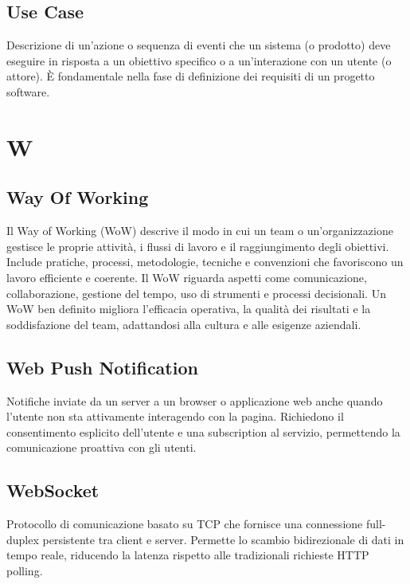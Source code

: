 \documentclass[10pt, letterpaper]{article}
\begin{document}
\subsection*{Use Case}
Descrizione di un'azione o sequenza di eventi che un sistema (o prodotto) deve eseguire in risposta a un obiettivo specifico o a un'interazione con un utente
(o attore). È fondamentale nella fase di definizione dei requisiti di un progetto software.

\section{W}

\subsection*{Way Of Working}
Il Way of Working (WoW) descrive il modo in cui un team o un'organizzazione gestisce le proprie attività, i flussi di lavoro e il raggiungimento degli obiettivi.
Include pratiche, processi, metodologie, tecniche e convenzioni che favoriscono un lavoro efficiente e coerente. Il WoW riguarda aspetti come comunicazione,
collaborazione, gestione del tempo, uso di strumenti e processi decisionali. Un WoW ben definito migliora l'efficacia operativa, la qualità dei risultati e la
soddisfazione del team, adattandosi alla cultura e alle esigenze aziendali.

\subsection*{Web Push Notification}
Notifiche inviate da un server a un browser o applicazione web anche quando l'utente non sta attivamente interagendo con la pagina.
Richiedono il consentimento esplicito dell'utente e una subscription al servizio, permettendo la comunicazione proattiva con gli utenti.

\subsection*{WebSocket}
Protocollo di comunicazione basato su TCP che fornisce una connessione full-duplex persistente tra client e server.
Permette lo scambio bidirezionale di dati in tempo reale, riducendo la latenza rispetto alle tradizionali richieste HTTP polling.
\end{document}
